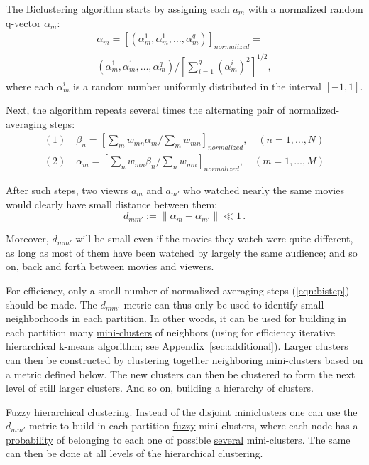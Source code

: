 \documentclass{article} %
\begin{document}
The Biclustering algorithm starts by assigning each $a_m$ with a normalized random q-vector $\alpha_m$:
\begin{equation}
\begin{split}
\alpha_m = \left[ (\alpha_m^1,\alpha_m^1,\ldots,\alpha_m^q) \right]_{normalized} =  \\
(\alpha_m^1,\alpha_m^1,\ldots,\alpha_m^q) /
\left[ \sum_{i=1}^q (\alpha_m^i)^2 \right]^{1/2},
\end{split}
\end{equation}
where each $\alpha_m^i$ is a random number uniformly distributed in the interval $[-1,1]$. 

Next, the algorithm repeats several times the alternating pair of normalized-averaging steps:
\begin{equation}
\begin{split}
(1) \quad \beta_n = \left[ \sum_m w_{mn} \alpha_m / \sum_m w_{mn} \right]_{normalized}, \quad (n=1,\ldots,N) \\
(2) \quad \alpha_m = \left[ \sum_n w_{mn} \beta_n / \sum_n w_{mn} \right]_{normalized}, \quad (m=1,\ldots,M) 
\end{split}
\label{eqn:bistep}
\end{equation}

After such steps, two viewrs $a_m$ and $a_{m'}$ who watched nearly the same movies would clearly have small distance between them:
\begin{equation}
d_{mm'} := \|\alpha_m - \alpha_{m'} \| \ll 1\,.
\end{equation}

Moreover, $d_{mm'}$ will be small even if the movies they watch were quite different, as long as most of them have been watched by largely the same audience; and so on, back and forth between movies and viewers.

For efficiency, only a small number of normalized averaging steps (\ref{eqn:bistep}) should be made. The $d_{mm'}$ metric can thus only be used to identify small neighborhoods in each partition. In other words, it can be used for building in each partition many \underline{mini-clusters} of neighbors (using for efficiency iterative hierarchical k-means algorithm; see Appendix~\ref{sec:additional}). Larger clusters can then be constructed by clustering together neighboring mini-clusters based on a metric defined below. The new clusters can then be clustered to form the next level of still larger clusters. And so on, building a hierarchy of clusters.

\underline{Fuzzy hierarchical clustering.} Instead of the disjoint miniclusters one can use the $d_{mm'}$ metric to build in each partition \underline{fuzzy} mini-clusters, where each node has a \underline{probability} of belonging to each one of possible \underline{several} mini-clusters. The same can then be done at all levels of the hierarchical clustering. 
\end{document}
